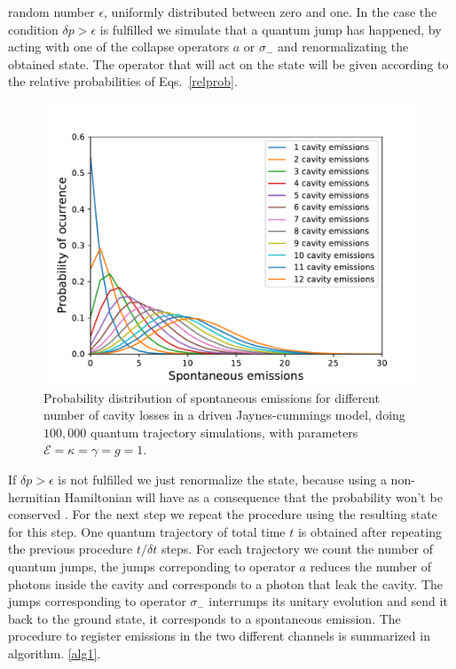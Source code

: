 \documentclass[%
 reprint,
 amsmath,amssymb,
 aps, 
]{revtex4-1}
\begin{document}
random number $\epsilon$, uniformly distributed between zero and one.
In the case the condition $\delta p > \epsilon$ is fulfilled we
simulate that a quantum jump has happened, by acting with one of the
collapse operators $a$ or $\sigma_-$ and renormalizating the obtained
state. The operator that will act on the state will be given according
to the relative probabilities of Eqs.~\eqref{relprob}.
\begin{figure}[!t] 
\centering
\includegraphics[scale = 0.5]{distributioneng.pdf}
\caption{\small{Probability distribution of spontaneous emissions for different number of cavity losses in a driven Jaynes-cummings model, doing $100,000$ quantum trajectory simulations, with parameters $\mathcal{E}  = \kappa = \gamma = g = 1$.}} \label{probdiss}
\end{figure}
If $\delta p > \epsilon$ is not fulfilled we just renormalize the
state, because using a non-hermitian Hamiltonian will have as a
consequence that the probability won't be conserved
\cite{Sakurai:1167961}. For the next step we repeat the procedure
using the resulting state for this step. One quantum trajectory of
total time $t$ is obtained after repeating the previous procedure
$t/\delta t$ steps. For each trajectory we count the number of quantum
jumps, the jumps correponding to operator $a$ reduces the number of
photons inside the cavity and corresponds to a photon that leak the
cavity. The jumps corresponding to operator $\sigma_-$ interrumps its
unitary evolution and send it back to the ground state, it corresponds
to a spontaneous emission. The procedure to register emissions in the
two different channels is summarized in algorithm. \ref{alg1}.
\end{document}
